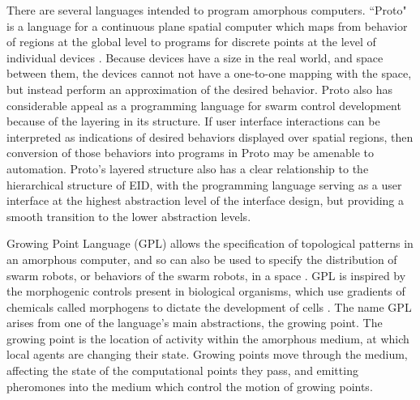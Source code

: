 There are several languages intended to program amorphous computers. 
``Proto" is a language for a continuous plane spatial computer which maps from behavior of regions at the global level to programs for discrete points at the level of individual devices \citep{beal2006infrastructure}. 
Because devices have a size in the real world, and space between them, the devices cannot not have a one-to-one mapping with the space, but instead perform an approximation of the desired behavior. 
Proto also has considerable appeal as a programming language for swarm control development because of the layering in its structure. 
If user interface interactions can be interpreted as indications of desired behaviors displayed over spatial regions, then conversion of those behaviors into programs in Proto may be amenable to automation. 
Proto's layered structure also has a clear relationship to the hierarchical structure of EID, with the programming language serving as a user interface at the highest abstraction level of the interface design, but providing a smooth transition to the lower abstraction levels.  

Growing Point Language (GPL) allows the specification of topological patterns in an amorphous computer, and so can also be used to specify the distribution of swarm robots, or behaviors of the swarm robots, in a space \citep{nagpal2004engineering}. 
GPL is inspired by the morphogenic controls present in biological organisms, which use gradients of chemicals called morphogens to dictate the development of cells \citep{turing1952chemical}.
The name GPL arises from one of the language's main abstractions, the growing point. 
The growing point is the location of activity within the amorphous medium, at which local agents are changing their state. 
Growing points move through the medium, affecting the state of the computational points they pass, and emitting pheromones into the medium which control the motion of growing points.

